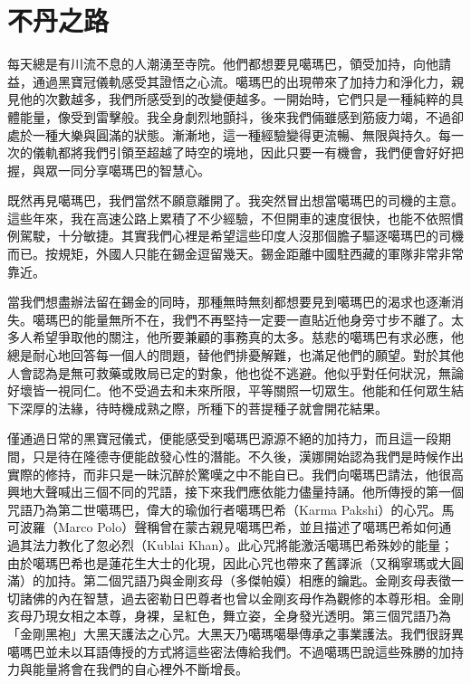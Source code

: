 \chapter{不丹之路}

每天總是有川流不息的人潮湧至寺院。他們都想要見噶瑪巴，領受加持，向他請益，通過黑寶冠儀軌感受其證悟之心流。噶瑪巴的出現帶來了加持力和淨化力，親見他的次數越多，我們所感受到的改變便越多。一開始時，它們只是一種純粹的具體能量，像受到雷擊般。我全身劇烈地顫抖，後來我們倆雖感到筋疲力竭，不過卻處於一種大樂與圓滿的狀態。漸漸地，這一種經驗變得更流暢、無限與持久。每一次的儀軌都將我們引領至超越了時空的境地，因此只要一有機會，我們便會好好把握，與眾一同分享噶瑪巴的智慧心。

既然再見噶瑪巴，我們當然不願意離開了。我突然冒出想當噶瑪巴的司機的主意。這些年來，我在高速公路上累積了不少經驗，不但開車的速度很快，也能不依照慣例駕駛，十分敏捷。其實我們心裡是希望這些印度人沒那個膽子驅逐噶瑪巴的司機而已。按規矩，外國人只能在錫金逗留幾天。錫金距離中國駐西藏的軍隊非常非常靠近。

當我們想盡辦法留在錫金的同時，那種無時無刻都想要見到噶瑪巴的渴求也逐漸消失。噶瑪巴的能量無所不在，我們不再堅持一定要一直貼近他身旁寸步不離了。太多人希望爭取他的關注，他所要兼顧的事務真的太多。慈悲的噶瑪巴有求必應，他總是耐心地回答每一個人的問題，替他們排憂解難，也滿足他們的願望。對於其他人會認為是無可救藥或敗局已定的對象，他也從不逃避。他似乎對任何狀況，無論好壞皆一視同仁。他不受過去和未來所限，平等關照一切眾生。他能和任何眾生結下深厚的法緣，待時機成熟之際，所種下的菩提種子就會開花結果。


僅通過日常的黑寶冠儀式，便能感受到噶瑪巴源源不絕的加持力，而且這一段期間，只是待在隆德寺便能啟發心性的潛能。不久後，漢娜開始認為我們是時候作出實際的修持，而非只是一昧沉醉於驚嘆之中不能自已。我們向噶瑪巴請法，他很高興地大聲喊出三個不同的咒語，接下來我們應依能力儘量持誦。他所傳授的第一個咒語乃為第二世噶瑪巴，偉大的瑜伽行者噶瑪巴希（Karma
Pakshi）的心咒。馬可波羅（Marco
Polo）聲稱曾在蒙古親見噶瑪巴希，並且描述了噶瑪巴希如何通過其法力教化了忽必烈（Kublai
Khan）。此心咒將能激活噶瑪巴希殊妙的能量；由於噶瑪巴希也是蓮花生大士的化現，因此心咒也帶來了舊譯派（又稱寧瑪或大圓滿）的加持。第二個咒語乃與金剛亥母（多傑帕嫫）相應的鑰匙。金剛亥母表徵一切諸佛的內在智慧，過去密勒日巴尊者也曾以金剛亥母作為觀修的本尊形相。金剛亥母乃現女相之本尊，身裸，呈紅色，舞立姿，全身發光透明。第三個咒語乃為「金剛黑袍」大黑天護法之心咒。大黑天乃噶瑪噶舉傳承之事業護法。我們很訝異噶嗎巴並未以耳語傳授的方式將這些密法傳給我們。不過噶瑪巴說這些殊勝的加持力與能量將會在我們的自心裡外不斷增長。

